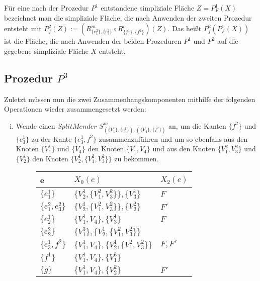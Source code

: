 \documentclass[12pt,titlepage]{article}
\begin{document}
Für eine nach der Prozedur $P^1$ entstandene simpliziale Fläche $Z=P^1_F(X)$  bezeichnet man die simpliziale Fläche, die nach Anwenden der zweiten Prozedur entsteht mit \emph{$P^2_f(Z)$}$:=(R^m_{\{e_1^2\},\{e_3^2\}}\circ R^c_{\{f^1\},\{f^2\}})(Z)$. Das heißt $P^2_f(P^1_F(X))$ ist die Fläche, die nach Anwenden der beiden Prozeduren $P^1$ und $P^2$ auf die gegebene simpliziale Fläche $X$ entsteht.

\subsection{Prozedur $P^3$}
 Zuletzt müssen nun die zwei Zusammenhangskomponenten mithilfe der folgenden Operationen wieder zusammengesetzt werden:
\begin{enumerate}[(i)]
\item Wende einen $SplitMender$ $S^{m}_{(\{V^1_{1}\},\{e^1_{3}\}),(\{V_{4}\},\{f^2\})}$ an, um die Kanten $\{f^2\}$ und $\{e_3^1\}$ zu der Kante $\{e_3^1,f^2\}$ zusammenzuführen und um so ebenfalls aus den Knoten $\{V_1^1\}$ und $\{V_4\}$ den Knoten $\{V_1^1,V_4\}$ und aus den Knoten $\{V_1^2,V_3^2\}$ und $\{V_2^1\}$ den Knoten $\{V_2^1,\{V_1^2,V_3^2\}\}$ zu bekommen.
\begin{figure}[H]
\begin{center}
\begin{tabularx}{\textwidth}{XXX}
\hline
\textbf{e}&\textbf{$X_0(e)$}&\textbf{$X_2(e)$}\\
 \hline
 $\{e_1^1\}$ & $\{V_2^1,\{V_1^2,V_3^2\}\},\{V_3^1\}$& $F$\\
 \hline 
  $\{e_1^2,e_3^2\}$ & $\{V_2^1,\{V_1^2,V_3^2\}\},\{V_2^2\}$&$F'$\\ 
  \hline
  $\{e_2^1\}$&$\{V_1^1,V_4\},\{V_3^1\}$ & $F$\\
  \hline
   $\{e_2^2\}$&$\{V_1^3\},\{V_2^1,\{V_1^2,V_3^2\}\}$ & \\
  \hline
  $\{e_3^1,f^2\}$&$\{V_1^1,V_4\},\{V_2^1,\{V_1^2,V_3^2\}\}$ & $F,F'$\\ \hline  
   $\{f^1\}$&$\{V_1^1,V_4\},\{V_1^3\}$& \\
   \hline
   $\{g\}$ & $\{V_1^1,V_4\},\{V_2^2\}$ & $F'$ \\
   \hline
 \end{tabularx} %
\end{center}
\end{figure}
\begin{figure}[H]

\end{figure}
\end{enumerate}
\end{document}

